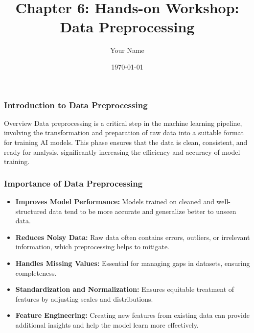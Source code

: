\documentclass{beamer}
\title{Chapter 6: Hands-on Workshop: Data Preprocessing}
\author{Your Name}
\institute{Your Institution}
\date{\today}
\begin{document}
\frame{\titlepage}

\begin{frame}[fragile]
    \frametitle{Introduction to Data Preprocessing}
    \begin{block}{Overview}
        Data preprocessing is a critical step in the machine learning pipeline, involving the transformation and preparation of raw data into a suitable format for training AI models. This phase ensures that the data is clean, consistent, and ready for analysis, significantly increasing the efficiency and accuracy of model training.
    \end{block}
\end{frame}

\begin{frame}[fragile]
    \frametitle{Importance of Data Preprocessing}
    \begin{itemize}
        \item \textbf{Improves Model Performance:} Models trained on cleaned and well-structured data tend to be more accurate and generalize better to unseen data.
        \item \textbf{Reduces Noisy Data:} Raw data often contains errors, outliers, or irrelevant information, which preprocessing helps to mitigate.
        \item \textbf{Handles Missing Values:} Essential for managing gaps in datasets, ensuring completeness.
        \item \textbf{Standardization and Normalization:} Ensures equitable treatment of features by adjusting scales and distributions.
        \item \textbf{Feature Engineering:} Creating new features from existing data can provide additional insights and help the model learn more effectively.
    \end{itemize}
\end{frame}
\end{document}
